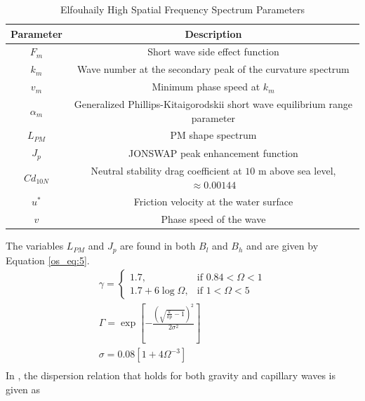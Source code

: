 \begin{table}[H]
  \begin{center}
      \renewcommand{\baselinestretch}{1} \small\normalsize
  \begin{quote}
    \caption[Elfouhaily High Spatial Frequency Spectrum Parameters]{Elfouhaily High Spatial Frequency Spectrum Parameters\label{os_tab:2}}
  \end{quote}
  \begin{tabular} {|c | c |}
    \hline
  \bf{Parameter} & \bf{Description} \\ \hline
  $F_m$ & Short wave side effect function \\ \hline
  $k_m$ &  Wave number at the secondary peak of the curvature spectrum \\ \hline
  $v_m$ &  Minimum phase speed at $k_m$ \\ \hline
  $\alpha_m$ & Generalized Phillips-Kitaigorodskii short wave equilibrium range parameter \\ \hline
  $L_{PM}$ & PM shape spectrum \\ \hline
  $J_p$ & JONSWAP peak enhancement function \\ \hline
  $Cd_{10N}$ & Neutral stability drag coefficient at $10$ m above sea level, $\approx 0.00144$ \\ \hline
  $u^*$ & Friction velocity at the water surface \\ \hline
  $v$ & Phase speed of the wave \\ \hline
\end{tabular}
\end{center}
\end{table}
\renewcommand{\baselinestretch}{2} \small\normalsize
The variables $L_{PM}$ and $J_p$ are found in both $B_l$ and $B_h$ and are given by Equation \ref{os_eq:5}.
\begin{equation}
\begin{gathered}
  \label{os_eq:5}
    \gamma = \begin{cases}
    1.7,& \text{if } 0.84 < \Omega < 1\\
    1.7 + 6\log{\Omega}, & \text{if } 1 < \Omega < 5
  \end{cases} \\
  \Gamma = \exp{\left[- \frac{\left(\sqrt{\frac{k}{kp} - 1} \right)^2}{2\sigma^2} \right]} \\
  \sigma = 0.08\left[1 + 4\Omega^{-3} \right] \\
\end{gathered}
\end{equation}
\renewcommand{\baselinestretch}{2} \small\normalsize
In \cite{elfouhaily}, the dispersion relation that holds for both gravity and capillary waves is given as 


